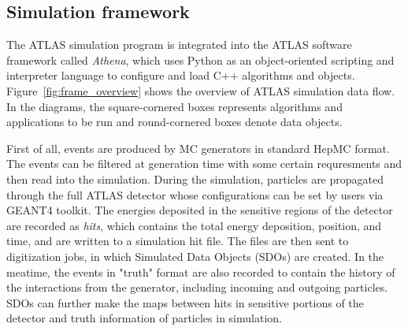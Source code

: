 \subsection{Simulation framework}

The ATLAS simulation program is integrated into the ATLAS software framework called \textit{Athena}\cite{atlas:athena},
which uses Python as an object-oriented scripting and interpreter language to configure and load C++ algorithms and objects.
Figure~\ref{fig:frame_overview} shows the overview of ATLAS simulation data flow\cite{Aad:2010ah}.
In the diagrams, the square-cornered boxes represents algorithms and applications to be run and round-cornered boxes denote data objects.

First of all, events are produced by MC generators in standard HepMC format.
The events can be filtered at generation time with some certain requresments and then read into the simulation.
During the simulation, particles are propagated through the full ATLAS detector whose configurations can be set by users via GEANT4 toolkit.
The energies deposited in the sensitive regions of the detector are recorded as \textit{hits}, which contains the total energy deposition,
position, and time, and are written to a simulation hit file.
The files are then sent to digitization jobs, in which Simulated Data Objects (SDOs) are created.
In the meatime, the events in "truth" format are also recorded to contain the history of the interactions from the generator, including incoming and outgoing particles.
SDOs can further make the maps between hits in sensitive portions of the detector and truth information of particles in simulation.


